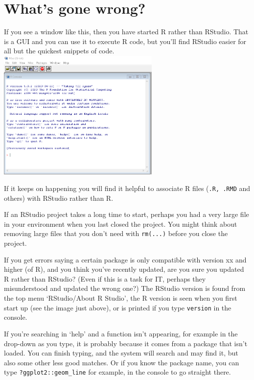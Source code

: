 \documentclass[
]{book}
\begin{document}
\hypertarget{whats-gone-wrong-1}{%
\section{What's gone wrong?}\label{whats-gone-wrong-1}}

If you see a window like this, then you have started R rather than RStudio. That is a GUI and you can use it to execute R code, but you'll find RStudio easier for all but the quickest snippets of code. \includegraphics[width=0.6\textwidth,height=\textheight]{images/RGui.png}

If it keeps on happening you will find it helpful to associate R files (\texttt{.R,\ .RMD} and others) with RStudio rather than R.

If an RStudio project takes a long time to start, perhaps you had a very large file in your environment when you last closed the project. You might think about removing large files that you don't need with \texttt{rm(...)} before you close the project.

If you get errors saying a certain package is only compatible with version xx and higher (of R), and you think you've recently updated, are you sure you updated R rather than RStudio? (Even if this is a task for IT, perhaps they misunderstood and updated the wrong one?) The RStudio version is found from the top menu `RStudio/About R Studio', the R version is seen when you first start up (see the image just above), or is printed if you type \texttt{version} in the console.

If you're searching in `help' and a function isn't appearing, for example in the drop-down as you type, it is probably because it comes from a package that isn't loaded. You can finish typing, and the system will search and may find it, but also some other less good matches. Or if you know the package name, you can type \texttt{?ggplot2::geom\_line} for example, in the console to go straight there.
\end{document}
